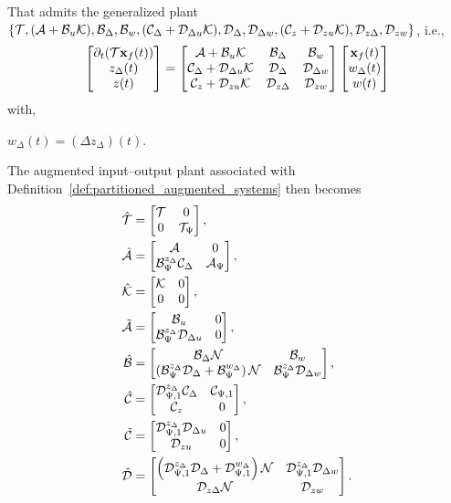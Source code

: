 That admits the generalized plant
$\{\mathcal{T}, (\mathcal{A}+\mathcal{B}_u\mathcal{K}), \mathcal{B}_{\Delta}, \mathcal{B}_{w},
	(\mathcal{C}_\Delta + \mathcal{D}_{\Delta u}\mathcal{K}), \mathcal{D}_\Delta,
	\mathcal{D}_{\Delta w}, (\mathcal{C}_z+\mathcal{D}_{zu}\mathcal{K}),
	\mathcal{D}_{z\Delta}, \mathcal{D}_{zw}\}$, i.e.,
\begin{equation*}
	\begin{bmatrix}\partial_t(\mathcal{T}\mathbf{x}_f(t)) \\ z_\Delta(t) \\ z(t)\end{bmatrix}
	=
	\begin{bmatrix}
		\mathcal{A}+\mathcal{B}_u\mathcal{K} & \mathcal{B}_{\Delta} & \mathcal{B}_{w} \\
		\mathcal{C}_\Delta + \mathcal{D}_{\Delta u}\mathcal{K} & \mathcal{D}_\Delta & \mathcal{D}_{\Delta w} \\
		\mathcal{C}_z+\mathcal{D}_{zu}\mathcal{K} & \mathcal{D}_{z\Delta} & \mathcal{D}_{zw}
	\end{bmatrix}
	\begin{bmatrix}\mathbf{x}_f(t) \\ w_\Delta(t) \\ w(t)\end{bmatrix}
\end{equation*}
with,
\begin{center}
	$w_\Delta(t) = (\Delta z_\Delta)(t).$
\end{center}
The augmented input--output plant associated with
Definition~\ref{def:partitioned_augmented_systems} then becomes
\begin{equation*}
	\begin{aligned}
		\hat{\mathcal{T}}
			&= \begin{bmatrix}\mathcal{T} & 0 \\ 0 & \mathcal{T}_\Psi\end{bmatrix}, \\
		\hat{\mathcal{A}}
			&= \begin{bmatrix}
				\mathcal{A} & 0 \\
				\mathcal{B}_\Psi^{z_\Delta}\mathcal{C}_\Delta & \mathcal{A}_\Psi
			\end{bmatrix}, \\
		\hat{\mathcal{K}}
			&= \begin{bmatrix}\mathcal{K} & 0 \\ 0 & 0\end{bmatrix}, \\
		\tilde{\mathcal{A}}
			&= \begin{bmatrix}
				\mathcal{B}_u & 0 \\
				\mathcal{B}^{z_\Delta}_\Psi\mathcal{D}_{\Delta u} & 0
			\end{bmatrix}, \\
		\hat{\mathcal{B}}
			&= \begin{bmatrix}
				\mathcal{B}_{\Delta}\mathcal{N} & \mathcal{B}_w \\
				\left(\mathcal{B}^{z_\Delta}_\Psi\mathcal{D}_\Delta
				+\mathcal{B}_\Psi^{w_\Delta}\right)\mathcal{N} &
				\mathcal{B}_{\Psi}^{z_\Delta}\mathcal{D}_{\Delta w}
			\end{bmatrix}, \\
		\hat{\mathcal{C}}
			&= \begin{bmatrix}
				\mathcal{D}^{z_\Delta}_{\Psi,1}\mathcal{C}_\Delta & \mathcal{C}_{\Psi,1} \\
				\mathcal{C}_z & 0
			\end{bmatrix}, \\
		\tilde{\mathcal{C}}
			&= \begin{bmatrix}
				\mathcal{D}_{\Psi,1}^{z_\Delta}\mathcal{D}_{\Delta u} & 0 \\
				\mathcal{D}_{zu} & 0
			\end{bmatrix}, \\
		\hat{\mathcal{D}}
			&= \begin{bmatrix}
				\left(\mathcal{D}^{z_\Delta}_{\Psi,1}\mathcal{D}_\Delta
				+\mathcal{D}^{w_\Delta}_{\Psi,1}\right)\mathcal{N} &
				\mathcal{D}^{z_\Delta}_{\Psi,1}\mathcal{D}_{\Delta w} \\
				\mathcal{D}_{z\Delta}\mathcal{N} & \mathcal{D}_{zw}
			\end{bmatrix}.
	\end{aligned}
\end{equation*}
